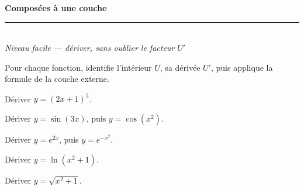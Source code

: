 \pagestyle{fancy}\fancyhf{}
\fancyfoot[C]{\small\thepage}
\renewcommand{\headrulewidth}{0.8pt}



\begin{center}
{\LARGE\bfseries\color{primarydark} Composées à une couche}\\[2pt]
{\color{primary}\rule{0.5\textwidth}{1.2pt}}\\[4pt]
{\small\itshape Niveau facile — dériver, sans oublier le facteur $U'$}
\end{center}
\vspace{2mm}

\begin{cle}[consigne]
Pour chaque fonction, identifie l'intérieur $U$, sa dérivée $U'$, puis applique la formule
de la couche externe.
\end{cle}

\begin{exo}
Dériver $y=(2x+1)^5$.
\end{exo}

\begin{exo}
Dériver $y=\sin(3x)$, puis $y=\cos(x^2)$.
\end{exo}

\begin{exo}
Dériver $y=e^{2x}$, puis $y=e^{-x^2}$.
\end{exo}

\begin{exo}
Dériver $y=\ln(x^2+1)$.
\end{exo}

\begin{exo}
Dériver $y=\sqrt{x^2+1}$.
\end{exo}


